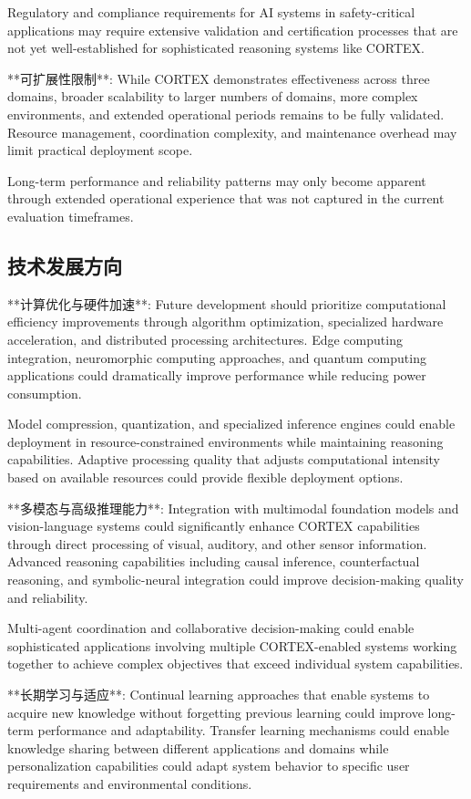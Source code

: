 Regulatory and compliance requirements for AI systems in safety-critical applications may require extensive validation and certification processes that are not yet well-established for sophisticated reasoning systems like CORTEX.

**可扩展性限制**:
While CORTEX demonstrates effectiveness across three domains, broader scalability to larger numbers of domains, more complex environments, and extended operational periods remains to be fully validated. Resource management, coordination complexity, and maintenance overhead may limit practical deployment scope.

Long-term performance and reliability patterns may only become apparent through extended operational experience that was not captured in the current evaluation timeframes.

\subsection{技术发展方向}

**计算优化与硬件加速**:
Future development should prioritize computational efficiency improvements through algorithm optimization, specialized hardware acceleration, and distributed processing architectures. Edge computing integration, neuromorphic computing approaches, and quantum computing applications could dramatically improve performance while reducing power consumption.

Model compression, quantization, and specialized inference engines could enable deployment in resource-constrained environments while maintaining reasoning capabilities. Adaptive processing quality that adjusts computational intensity based on available resources could provide flexible deployment options.

**多模态与高级推理能力**:
Integration with multimodal foundation models and vision-language systems could significantly enhance CORTEX capabilities through direct processing of visual, auditory, and other sensor information. Advanced reasoning capabilities including causal inference, counterfactual reasoning, and symbolic-neural integration could improve decision-making quality and reliability.

Multi-agent coordination and collaborative decision-making could enable sophisticated applications involving multiple CORTEX-enabled systems working together to achieve complex objectives that exceed individual system capabilities.

**长期学习与适应**:
Continual learning approaches that enable systems to acquire new knowledge without forgetting previous learning could improve long-term performance and adaptability. Transfer learning mechanisms could enable knowledge sharing between different applications and domains while personalization capabilities could adapt system behavior to specific user requirements and environmental conditions.

